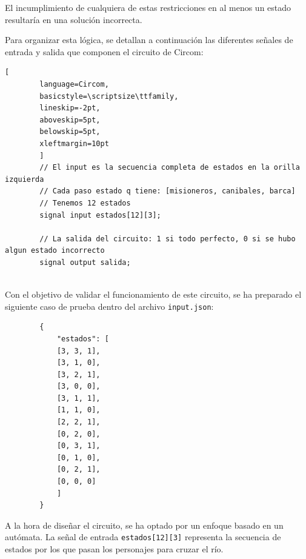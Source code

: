 \documentclass[a4paper,12pt]{report}
\begin{document}
	\vspace{0.2cm}
	\noindent El incumplimiento de cualquiera de estas restricciones en al menos un estado resultaría en una solución incorrecta.
	
	\vspace{0.2cm}
	\noindent Para organizar esta lógica, se detallan a continuación las diferentes señales de entrada y salida que componen el circuito de Circom:
	
	\vspace{0.3cm}
	\begin{lstlisting}[
		language=Circom,
		basicstyle=\scriptsize\ttfamily, 
		lineskip=-2pt,                  
		aboveskip=5pt,                  
		belowskip=5pt,                  
		xleftmargin=10pt
		]
		// El input es la secuencia completa de estados en la orilla izquierda
		// Cada paso estado q tiene: [misioneros, canibales, barca]
		// Tenemos 12 estados
		signal input estados[12][3]; 
		
		// La salida del circuito: 1 si todo perfecto, 0 si se hubo algun estado incorrecto
		signal output salida;
		
	\end{lstlisting}
	
	\vspace{0.4cm}
	\noindent Con el objetivo de validar el funcionamiento de este circuito, se ha preparado el siguiente caso de prueba dentro del archivo \texttt{input.json}:
	
	\begingroup
	
	\vspace{0.2cm}
	\begin{lstlisting}
		{
			"estados": [
			[3, 3, 1],
			[3, 1, 0],
			[3, 2, 1],
			[3, 0, 0],
			[3, 1, 1],
			[1, 1, 0],
			[2, 2, 1],
			[0, 2, 0],
			[0, 3, 1],
			[0, 1, 0],
			[0, 2, 1],
			[0, 0, 0]
			]
		}
	\end{lstlisting}
	
	\endgroup
	
	\vspace{0.2cm}
	\noindent A la hora de diseñar el circuito, se ha optado por un enfoque basado en un autómata. La señal de entrada \texttt{estados[12][3]} representa la secuencia de estados por los que pasan los personajes para cruzar el río.
	
\end{document}

